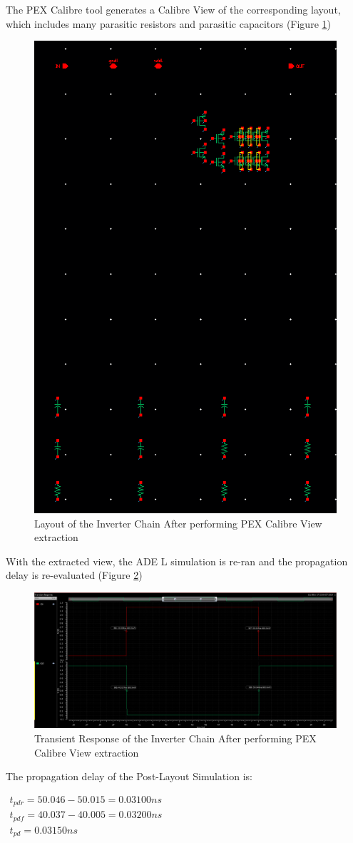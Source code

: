 \documentclass[letterpaper, 11pt]{article}
\begin{document}
The PEX Calibre tool generates a Calibre View of the corresponding layout, which includes many parasitic resistors and parasitic capacitors (Figure \ref{fig6})

\begin{figure}[htb!]
	\centering
	\includegraphics[width=0.35\linewidth]{inv_chain_3_calibre_view.png}
	\caption{Layout of the Inverter Chain After performing PEX Calibre View extraction}
	\label{fig6}
\end{figure}

With the extracted view, the ADE L simulation is re-ran and the propagation delay is re-evaluated (Figure \ref{fig7})

\begin{figure}[htb!]
	\centering
	\includegraphics[width=0.85\linewidth]{inv_chain_3_calibre_prop_delay.png}
	\caption{Transient Response of the Inverter Chain After performing PEX Calibre View extraction}
	\label{fig7}
\end{figure}

\pagebreak

The propagation delay of the Post-Layout Simulation is:

\begin{math}\label{eq7}
\begin{array}{l}
t_{pdr} = 50.046 - 50.015 = 0.03100ns\\
t_{pdf} = 40.037 - 40.005 = 0.03200ns\\
t_{pd} = 0.03150ns
\end{array}
\end{math}
\end{document}
